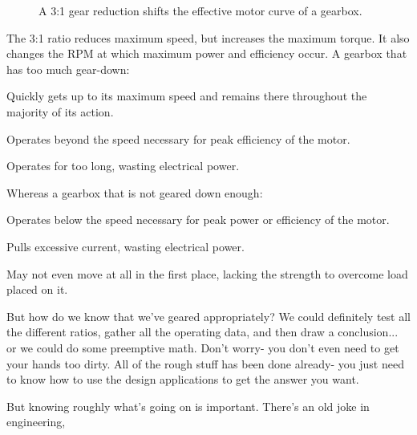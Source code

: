 \documentclass[10pt,letterpaper]{book}
\begin{document}
\begin{figure}[H] \centering
{}
\caption{A 3:1 gear reduction shifts the effective motor curve of a gearbox.}
\end{figure}

The 3:1 ratio reduces maximum speed, but increases the maximum torque. It also changes the RPM at which maximum power and efficiency occur. A gearbox that has too much gear-down:
\begin{asparaitem}
	\item Quickly gets up to its maximum speed and remains there throughout the majority of its action.
	\item Operates beyond the speed necessary for peak efficiency of the motor.
	\item Operates for too long, wasting electrical power.
\end{asparaitem}

Whereas a gearbox that is not geared down enough:
\begin{asparaitem}
	\item Operates below the speed necessary for peak power or efficiency of the motor.
	\item Pulls excessive current, wasting electrical power.
	\item May not even move at all in the first place, lacking the strength to overcome load placed on it.
\end{asparaitem}

But how do we know that we've geared appropriately? We could definitely test all the different ratios, gather all the operating data, and then draw a conclusion... or we could do some preemptive math. Don't worry- you don't even need to get your hands too dirty. All of the rough stuff has been done already- you just need to know how to use the design applications to get the answer you want.

But knowing roughly what's going on is important. There's an old joke in engineering,
\end{document}
